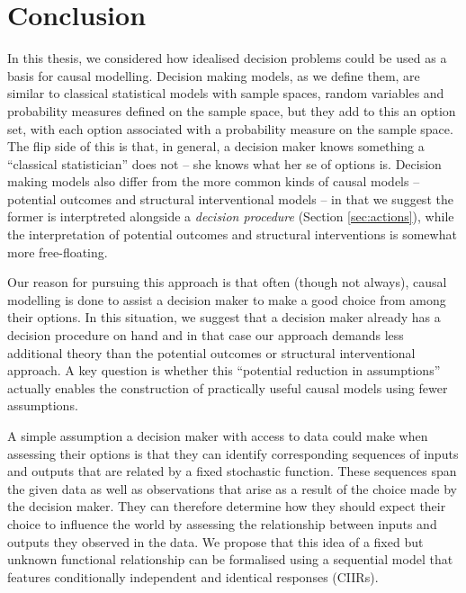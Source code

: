 

\chapter{Conclusion}\label{ch:discussion}

In this thesis, we considered how idealised decision problems could be used as a basis for causal modelling. Decision making models, as we define them, are similar to classical statistical models with sample spaces, random variables and probability measures defined on the sample space, but they add to this an option set, with each option associated with a probability measure on the sample space. The flip side of this is that, in general, a decision maker knows something a ``classical statistician'' does not -- she knows what her se of options is. Decision making models also differ from the more common kinds of causal models -- potential outcomes and structural interventional models -- in that we suggest the former is interptreted alongside a \emph{decision procedure} (Section \ref{sec:actions}), while the interpretation of potential outcomes and structural interventions is somewhat more free-floating.

Our reason for pursuing this approach is that often (though not always), causal modelling is done to assist a decision maker to make a good choice from among their options. In this situation, we suggest that a decision maker already has a decision procedure on hand and in that case our approach demands less additional theory than the potential outcomes or structural interventional approach. A key question is whether this ``potential reduction in assumptions'' actually enables the construction of practically useful causal models using fewer assumptions.

A simple assumption a decision maker with access to data could make when assessing their options is that they can identify corresponding sequences of inputs and outputs that are related by a fixed stochastic function. These sequences span the given data as well as observations that arise as a result of the choice made by the decision maker. They can therefore determine how they should expect their choice to influence the world by assessing the relationship between inputs and outputs they observed in the data.  We propose that this idea of a fixed but unknown functional relationship can be formalised using a sequential model that features conditionally independent and identical responses (CIIRs).

